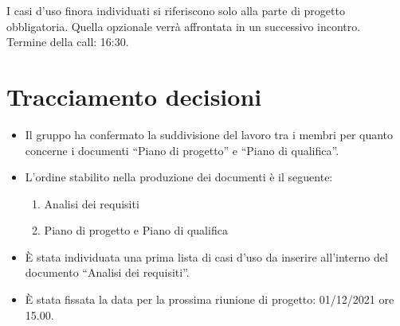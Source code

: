 \noindent I casi d'uso finora individuati si riferiscono solo alla parte di progetto obbligatoria. Quella opzionale verrà affrontata in un successivo incontro. \\

\noindent Termine della call: 16:30.

\section{Tracciamento decisioni}

\begin{itemize}
	\item Il gruppo ha confermato la suddivisione del lavoro tra i membri per quanto concerne i documenti ``Piano di progetto'' e ``Piano di qualifica''.
	\item L'ordine stabilito nella produzione dei documenti è il seguente:
		\begin{enumerate}
		\item Analisi dei requisiti
		\item Piano di progetto e Piano di qualifica
		\end{enumerate}
	\item È stata individuata una prima lista di casi d'uso da inserire all'interno del documento ``Analisi dei requisiti''.
	\item È stata fissata la data per la prossima riunione di progetto: 01/12/2021 ore 15.00.
\end{itemize}